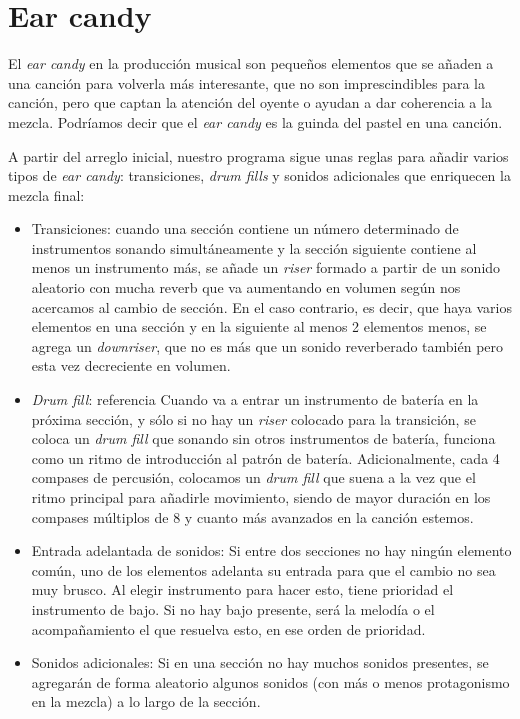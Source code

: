 \section{Ear candy}
\label{sec:ear-candy}
El \textit{ear candy} en la producción musical son pequeños elementos que se añaden a una canción para volverla más interesante, que no son imprescindibles para la canción, pero que captan la atención del oyente o ayudan a dar coherencia a la mezcla. Podríamos decir que el \textit{ear candy} es la guinda del pastel en una canción.

A partir del arreglo inicial, nuestro programa sigue unas reglas para añadir varios tipos de \textit{ear candy}: transiciones, \textit{drum fills} y sonidos adicionales que enriquecen la mezcla final:


\begin{itemize}

\item Transiciones: cuando una sección contiene un número determinado de instrumentos sonando simultáneamente y la sección siguiente contiene al menos un instrumento más, se añade un \textit{riser} formado a partir de un sonido aleatorio con mucha reverb que va aumentando en volumen según nos acercamos al cambio de sección. En el caso contrario, es decir, que haya varios elementos en una sección y en la siguiente al menos 2 elementos menos, se agrega un \textit{downriser}, que no es más que un sonido reverberado también pero esta vez decreciente en volumen.

\item \textit{Drum fill}: referencia Cuando va a entrar un instrumento de batería en la próxima sección, y sólo si no hay un \textit{riser} colocado para la transición, se coloca un \textit{drum fill} que sonando sin otros instrumentos de batería, funciona como un ritmo de introducción al patrón de batería. Adicionalmente, cada 4 compases de percusión, colocamos un \textit{drum fill} que suena a la vez que el ritmo principal para añadirle movimiento, siendo de mayor duración en los compases múltiplos de 8 y cuanto más avanzados en la canción estemos.

\item  Entrada adelantada de sonidos: Si entre dos secciones no hay ningún elemento común, uno de los elementos adelanta su entrada para que el cambio no sea muy brusco. Al elegir instrumento para hacer esto, tiene prioridad el instrumento de bajo. Si no hay bajo presente, será la melodía o el acompañamiento el que resuelva esto, en ese orden de prioridad.

\item  Sonidos adicionales: Si en una sección no hay muchos sonidos presentes, se agregarán de forma aleatorio algunos sonidos (con más o menos protagonismo en la mezcla) a lo largo de la sección.


\end{itemize}

